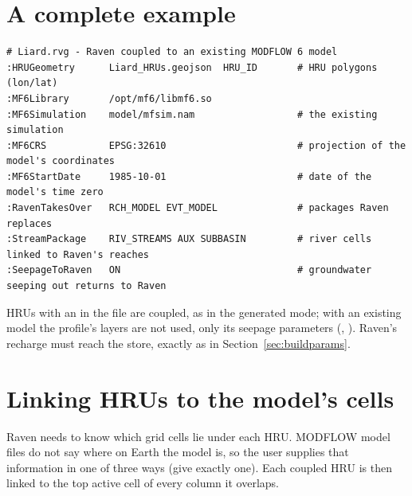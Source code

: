 \section{A complete example}
\begin{lstlisting}
# Liard.rvg - Raven coupled to an existing MODFLOW 6 model
:HRUGeometry      Liard_HRUs.geojson  HRU_ID       # HRU polygons (lon/lat)
:MF6Library       /opt/mf6/libmf6.so
:MF6Simulation    model/mfsim.nam                  # the existing simulation
:MF6CRS           EPSG:32610                       # projection of the model's coordinates
:MF6StartDate     1985-10-01                       # date of the model's time zero
:RavenTakesOver   RCH_MODEL EVT_MODEL              # packages Raven replaces
:StreamPackage    RIV_STREAMS AUX SUBBASIN         # river cells linked to Raven's reaches
:SeepageToRaven   ON                               # groundwater seeping out returns to Raven
\end{lstlisting}
HRUs with an  in the  file are coupled, as in the generated mode; with an existing model
the profile's layers are not used, only its seepage parameters (, ).
Raven's recharge must reach the  store, exactly as in Section~\ref{sec:buildparams}.

\section{Linking HRUs to the model's cells}
Raven needs to know which grid cells lie under each HRU. MODFLOW model files do not say where on Earth the model is, so the
user supplies that information in one of three ways (give exactly one). Each coupled HRU is then linked to the top active
cell of every column it overlaps.

